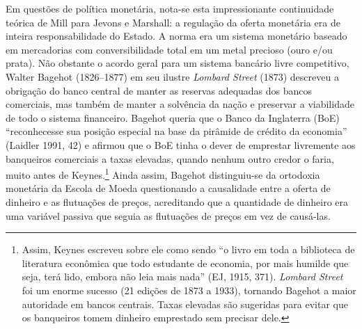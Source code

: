\documentclass[12pt]{article}
\begin{document}
Em questões de política monetária, nota-se esta impressionante continuidade teórica de Mill para Jevons e Marshall: a regulação da oferta monetária era de inteira responsabilidade do Estado. A norma era um sistema monetário baseado em mercadorias com conversibilidade total em um metal precioso (ouro e/ou prata). Não obstante o acordo geral para um sistema bancário livre competitivo, Walter Bagehot (1826–1877) em seu ilustre \textit{Lombard Street} (1873) descreveu a obrigação do banco central de manter as reservas adequadas dos bancos comerciais, mas também de manter a solvência da nação e preservar a viabilidade de todo o sistema financeiro. Bagehot queria que o Banco da Inglaterra (BoE) “reconhecesse sua posição especial na base da pirâmide de crédito da economia” (Laidler 1991, 42) e afirmou que o BoE tinha o dever de emprestar livremente aos banqueiros comerciais a taxas elevadas, quando nenhum outro credor o faria, muito antes de Keynes.\footnote{Assim, Keynes escreveu sobre ele como sendo “o livro em toda a biblioteca de literatura econômica que todo estudante de economia, por mais humilde que seja, terá lido, embora não leia mais nada” (EJ, 1915, 371). \textit{Lombard Street} foi um enorme sucesso (21 edições de 1873 a 1933), tornando Bagehot a maior autoridade em bancos centrais. Taxas elevadas são sugeridas para evitar que os banqueiros tomem dinheiro emprestado sem precisar dele.} Ainda assim, Bagehot distinguiu-se da ortodoxia monetária da Escola de Moeda questionando a causalidade entre a oferta de dinheiro e as flutuações de preços, acreditando que a quantidade de dinheiro era uma variável passiva que seguia as flutuações de preços em vez de causá-las.
\end{document}
